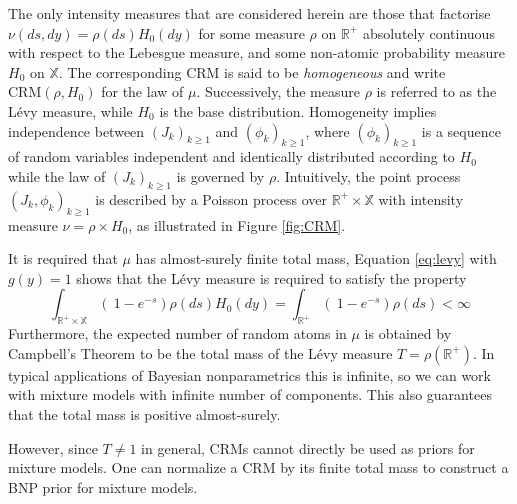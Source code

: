 The only intensity measures that are considered herein are those that factorise $\nu(ds, dy) = \rho(ds)H_0(dy)$ for some measure $\rho$ on $\mathbb{R}^+$ absolutely continuous with respect to the Lebesgue measure, and some non-atomic probability measure $H_0$ on $\mathbb{X}$. The corresponding \gls{CRM} is said to be \textit{homogeneous} and write $\text{CRM}(\rho, H_0)$ for the law of $\mu$. Successively, the measure $\rho$ is referred to as the Lévy measure, while $H_0$ is the base distribution.
Homogeneity implies independence between $\left(J_k \right)_{k\ge1}$ and $\left(\phi_k \right)_{k\ge1}$, where $\left(\phi_k \right)_{k\ge1}$ is a sequence of random variables independent and identically distributed according to $H_0$ while the law of $\left(J_k \right)_{k\ge1}$  is governed by $\rho$. Intuitively, the point process $\left(J_k, \phi_k \right)_{k\ge1}$  is described by a Poisson process over $\mathbb{R}^+ \times \mathbb{X}$ with intensity measure $\nu = \rho \times H_0$, as illustrated in Figure \ref{fig:CRM}.


It is required that $\mu$ has almost-surely finite total mass, Equation \ref{eq:levy} with $g(y)=1$ shows that the Lévy measure is required to satisfy the property
$$ \int_{\mathbb{R}^+ \times \mathbb{X}} \left( \  1 - e^{-s} \right) \rho(ds) H_0(dy) = 
\int_{\mathbb{R}^+} \left( \  1 - e^{-s} \right) \rho(ds) < \infty $$
Furthermore, the expected number of random atoms in $\mu$ is obtained by Campbell’s Theorem to be the total mass of the Lévy measure $T = \rho(\mathbb{R}^+)$. In typical applications of Bayesian nonparametrics this is infinite, so we can work with mixture models with infinite number of components. This also guarantees that the total mass is positive almost-surely. 

However, since $T \neq 1$ in general, \glspl{CRM} cannot directly be used as priors for mixture models.
One can normalize a \gls{CRM} by its finite total mass to construct a BNP prior for mixture models.\\

